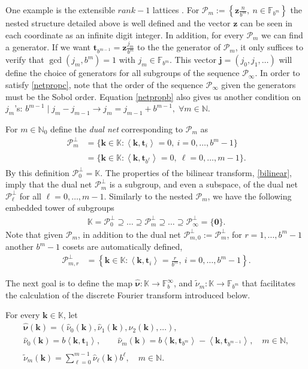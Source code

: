 \documentclass[graybox,footinfo]{svmult}
\newcommand{\naturals}{\mathbb{N}} %
\newcommand{\vzero}{\boldsymbol{0}} %
\newcommand{\vt}{\boldsymbol{t}}    %
\newcommand{\vz}{\boldsymbol{z}}    %
\newcommand{\natzero}{\mathbb{N}_{0}}
\newcommand{\bbK}{\mathbb{K}}
\newcommand{\bbF}{\mathbb{F}}
\newcommand{\ip}[3][{}]{\ensuremath{\left \langle #2, #3 \right \rangle_{#1}}}
\newcommand{\vk}{\boldsymbol{k}}    %
\newcommand{\vj}{\boldsymbol{j}}    %
\newcommand{\vnu}{\boldsymbol{\nu}} %
\newcommand{\hvnu}{\widehat{\vnu}}
\newcommand{\tnu}{\tilde{\nu}}
\newcommand{\hnu}{\hat{\nu}}
\newcommand{\cp}{\mathcal{P}}
\begin{document}
One example is the extensible $rank-1$ lattices \cite{HicNie03a}. For $\cp_m :=\left\{\vz\frac{n}{b^m},\ n\in\bbF_{b^m}\right\}$ the nested structure detailed above is well defined and the vector $\vz$ can be seen in each coordinate as an infinite digit integer. In addition, for every $\cp_m$ we can find a generator. If we want $\vt_{b^{m-1}}=\vz\frac{j_m}{b^m}$ to the the generator of $\cp_m$, it only suffices to verify that $\gcd(j_m,b^m)=1$ with $j_m\in\bbF_{b^m}$. This vector $\vj=(j_0,j_1,\dots)$ will define the choice of generators for all subgroups of the sequence $\cp_\infty$. In order to satisfy \eqref{netpropc}, note that the order of the sequence $\cp_\infty$ given the generators must be the Sobol order. Equation \eqref{netpropb} also gives us another condition on $j_m$'s: $ b^{m-1} \mid j_m-j_{m-1}\rightarrow j_m=j_{m-1}+b^{m-1},\;\forall m\in\naturals$.

For $m \in \natzero$ define the \emph{dual net} corresponding to $\cp_m$ as
\begin{align*}
\cp^{\perp}_m &= \{\vk \in \bbK : \ip{\vk}{\vt_i} = 0, \ i=0, \ldots, b^m-1\} \\
&= \{\vk \in \bbK : \ip{\vk}{\vt_{b^{\ell}}} = 0, \ \ell=0, \ldots, m-1\}.
\end{align*}
By this definition $\cp^{\perp}_{0}=\bbK$.  The properties of the bilinear transform, \eqref{bilinear}, imply that the dual net $\cp^{\perp}_m$ is a subgroup, and even a subspace, of the dual net $\cp^{\perp}_\ell$ for all $\ell=0, \ldots, m-1$. Similarly to the nested $\cp_m$, we have the following embedded tower of subgroups
\begin{align*}
\bbK=\cp^{\perp}_0\supseteq\dots\supseteq\cp^{\perp}_m\supseteq\dots\supseteq\cp^{\perp}_\infty=\{\vzero\}.
\end{align*}
Note that given $\cp_m$, in addition to the dual net $\cp^{\perp}_{m,0}:=\cp^{\perp}_{m}$, for $r=1,\dots,b^m-1$ another $b^m-1$ cosets are automatically defined,
\begin{align*}
\cp^{\perp}_{m,r} &= \left\{\vk \in \bbK : \ip{\vk}{\vt_i} = \frac{r}{b^m}, \ i=0, \ldots, b^m-1\right\}.
\end{align*}

The next goal is to define the map $\hvnu : \bbK \to \bbF_b^{\infty}$, and $\tnu_m : \bbK \to \bbF_{b^m}$ that facilitates the calculation of the discrete Fourier transform introduced below.

\begin{definition} \label{numapdef} For every $\vk \in \bbK$, let
\begin{subequations} \label{numapdefeq}
\begin{gather}
\hvnu(\vk)=(\hnu_0(\vk), \hnu_1(\vk), \hnu_2(\vk), \ldots ), \\
\hnu_0(\vk) = b\ip{\vk}{\vt_{1}}, \qquad \hnu_m(\vk)=b\ip{\vk}{\vt_{b^m}}-\ip{\vk}{\vt_{b^{m-1}}}, \quad m \in \naturals, \\
\tnu_m(\vk) = \sum_{\ell=0}^{m-1} \hnu_{\ell}(\vk) b^{\ell}, \quad m \in \naturals.
\end{gather}
\end{subequations}
\end{definition}
\end{document}
